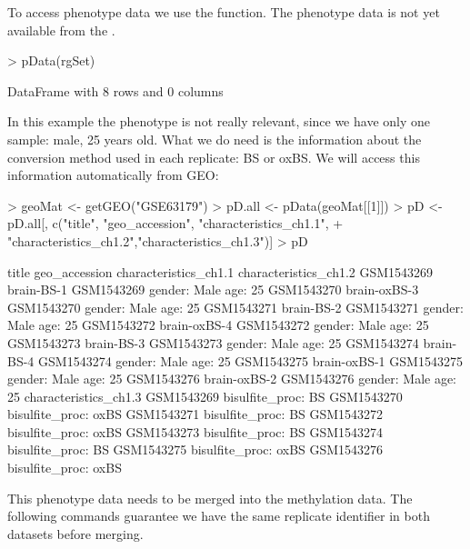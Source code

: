 \documentclass{article}
\begin{document}
To access phenotype data we use the  function. The phenotype data is not yet available from the .
\begin{Schunk}
\begin{Sinput}
> pData(rgSet)
\end{Sinput}
\begin{Soutput}
DataFrame with 8 rows and 0 columns
\end{Soutput}
\end{Schunk}
In this example the phenotype is not really relevant, since we have only one sample: male, 25 years old. What we do need is the information about the conversion method used in each replicate: BS or oxBS. We will access this information automatically from GEO:
\begin{Schunk}
\begin{Sinput}
> geoMat <- getGEO("GSE63179")
> pD.all <- pData(geoMat[[1]])
> pD <- pD.all[, c("title", "geo_accession", "characteristics_ch1.1",
+                  "characteristics_ch1.2","characteristics_ch1.3")]
> pD
\end{Sinput}
\end{Schunk}


\begin{Schunk}
\begin{Soutput}
                  title geo_accession characteristics_ch1.1 characteristics_ch1.2
GSM1543269   brain-BS-1    GSM1543269          gender: Male               age: 25
GSM1543270 brain-oxBS-3    GSM1543270          gender: Male               age: 25
GSM1543271   brain-BS-2    GSM1543271          gender: Male               age: 25
GSM1543272 brain-oxBS-4    GSM1543272          gender: Male               age: 25
GSM1543273   brain-BS-3    GSM1543273          gender: Male               age: 25
GSM1543274   brain-BS-4    GSM1543274          gender: Male               age: 25
GSM1543275 brain-oxBS-1    GSM1543275          gender: Male               age: 25
GSM1543276 brain-oxBS-2    GSM1543276          gender: Male               age: 25
           characteristics_ch1.3
GSM1543269    bisulfite_proc: BS
GSM1543270  bisulfite_proc: oxBS
GSM1543271    bisulfite_proc: BS
GSM1543272  bisulfite_proc: oxBS
GSM1543273    bisulfite_proc: BS
GSM1543274    bisulfite_proc: BS
GSM1543275  bisulfite_proc: oxBS
GSM1543276  bisulfite_proc: oxBS
\end{Soutput}
\end{Schunk}


This phenotype data needs to be merged into the methylation data. The following commands guarantee we have the same replicate identifier in both datasets before merging.
\end{document}
